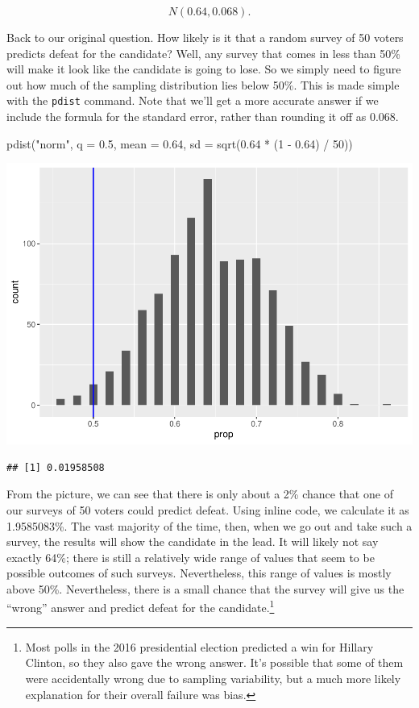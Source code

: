 \documentclass[
]{book}
\newenvironment{Shaded}{\begin{snugshade}}{\end{snugshade}}
\newcommand{\AttributeTok}[1]{\textcolor[rgb]{0.77,0.63,0.00}{#1}}
\newcommand{\DecValTok}[1]{\textcolor[rgb]{0.00,0.00,0.81}{#1}}
\newcommand{\FloatTok}[1]{\textcolor[rgb]{0.00,0.00,0.81}{#1}}
\newcommand{\FunctionTok}[1]{\textcolor[rgb]{0.00,0.00,0.00}{#1}}
\newcommand{\NormalTok}[1]{#1}
\newcommand{\SpecialCharTok}[1]{\textcolor[rgb]{0.00,0.00,0.00}{#1}}
\newcommand{\StringTok}[1]{\textcolor[rgb]{0.31,0.60,0.02}{#1}}
\begin{document}
\[
N(0.64, 0.068).
\]

Back to our original question. How likely is it that a random survey of 50 voters predicts defeat for the candidate? Well, any survey that comes in less than 50\% will make it look like the candidate is going to lose. So we simply need to figure out how much of the sampling distribution lies below 50\%. This is made simple with the \texttt{pdist} command. Note that we'll get a more accurate answer if we include the formula for the standard error, rather than rounding it off as 0.068.

\begin{Shaded}
\begin{Highlighting}[]
\FunctionTok{pdist}\NormalTok{(}\StringTok{"norm"}\NormalTok{, }\AttributeTok{q =} \FloatTok{0.5}\NormalTok{,}
      \AttributeTok{mean =} \FloatTok{0.64}\NormalTok{, }\AttributeTok{sd =} \FunctionTok{sqrt}\NormalTok{(}\FloatTok{0.64} \SpecialCharTok{*}\NormalTok{ (}\DecValTok{1} \SpecialCharTok{{-}} \FloatTok{0.64}\NormalTok{) }\SpecialCharTok{/} \DecValTok{50}\NormalTok{))}
\end{Highlighting}
\end{Shaded}

\includegraphics{intro_stats_files/figure-latex/unnamed-chunk-377-1.pdf}

\begin{verbatim}
## [1] 0.01958508
\end{verbatim}

From the picture, we can see that there is only about a 2\% chance that one of our surveys of 50 voters could predict defeat. Using inline code, we calculate it as 1.9585083\%. The vast majority of the time, then, when we go out and take such a survey, the results will show the candidate in the lead. It will likely not say exactly 64\%; there is still a relatively wide range of values that seem to be possible outcomes of such surveys. Nevertheless, this range of values is mostly above 50\%. Nevertheless, there is a small chance that the survey will give us the ``wrong'' answer and predict defeat for the candidate.\footnote{Most polls in the 2016 presidential election predicted a win for Hillary Clinton, so they also gave the wrong answer. It's possible that some of them were accidentally wrong due to sampling variability, but a much more likely explanation for their overall failure was bias.}
\end{document}

